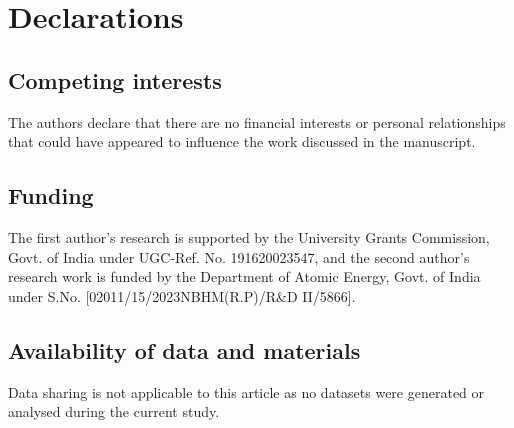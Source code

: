 \documentclass{birkjour}
\theoremstyle{definition}
\theoremstyle{remark}
\numberwithin{equation}{section}
\begin{document}
\section*{Declarations}

\subsection*{Competing interests}
The authors declare that there are no financial interests or personal relationships that could have appeared to influence the work discussed in the manuscript.

\subsection*{Funding}
The first author's research is supported by the University Grants Commission, Govt. of India under UGC-Ref. No. 191620023547, and the second author's research work is funded by the Department of Atomic Energy, Govt. of India under S.No. [02011/15/2023NBHM(R.P)/R\&D II/5866].

\subsection*{Availability of data and materials}
Data sharing is not applicable to this article as no datasets were generated or analysed during the current study.
\end{document}
